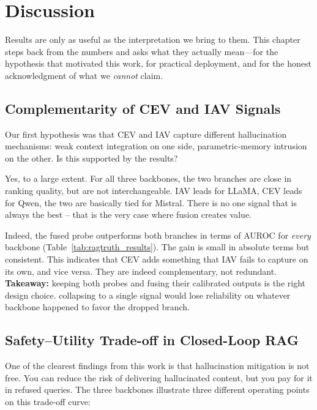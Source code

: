 \chapter{Discussion}
\label{ch:discussion}

Results are only as useful as the interpretation we bring to them. This chapter steps back from the numbers and asks what they actually mean—for the hypothesis that motivated this work, for practical deployment, and for the honest acknowledgment of what we \emph{cannot} claim.

\section{Complementarity of CEV and IAV Signals}
\label{sec:complementarity}

Our first hypothesis was that CEV and IAV capture different hallucination mechanisms: weak context integration on one side, parametric-memory intrusion on the other. Is this supported by the results?

Yes, to a large extent. For all three backbones, the two branches are close in ranking quality, but are not interchangeable. IAV leads for LLaMA, CEV leads for Qwen, the two are basically tied for Mistral. There is no one signal that is always the best – that is the very case where fusion creates value.

Indeed, the fused probe outperforms both branches in terms of AUROC for \emph{every} backbone (Table~\ref{tab:ragtruth_results}). The gain is small in absolute terms but consistent. This indicates that CEV adds something that IAV fails to capture on its own, and vice versa. They are indeed complementary, not redundant. \textbf{Takeaway:} keeping both probes and fusing their calibrated outputs is the right design choice. collapsing to a single signal would lose reliability on whatever backbone happened to favor the dropped branch.

\section{Safety--Utility Trade-off in Closed-Loop RAG}
\label{sec:safety_utility}

One of the clearest findings from this work is that hallucination mitigation is not free. You can reduce the risk of delivering hallucinated content, but you pay for it in refused queries. The three backbones illustrate three different operating points on this trade-off curve:


